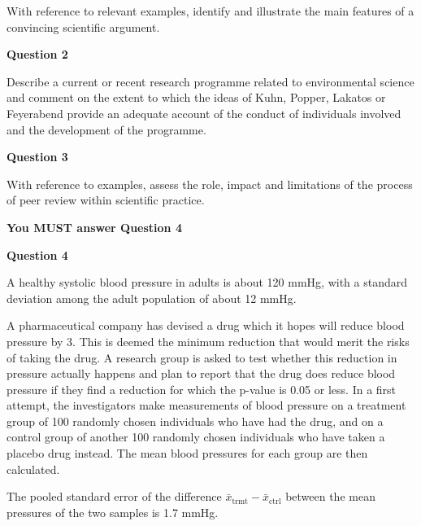 \documentclass[a4paper,12pt,fleqn]{article}
\begin{document}
With reference to relevant examples, identify and illustrate the main features of a convincing scientific argument.

\vspace{1cm}

\textbf{Question 2}\newline

Describe a current or recent research programme related to environmental science and comment on the extent to which the ideas of Kuhn, Popper, Lakatos or Feyerabend provide an adequate account of the conduct of individuals involved and the development of the programme. 

\vspace{1cm}

\textbf{Question 3}\newline

With reference to examples, assess the role, impact and limitations of the process of peer review within scientific practice.

\vspace{1cm}

\textbf{\large{You MUST answer Question 4}}\newline

\textbf{Question 4}\newline


	A healthy systolic blood pressure in adults is about 120 mmHg, with a standard deviation among the adult population of about 12 mmHg. \newline
	
	A pharmaceutical company has devised a drug which it hopes will reduce blood pressure by \SI{3}{\mmhg}. This is deemed the minimum reduction that would merit the risks of taking the drug. A research group is asked to test whether this reduction in pressure actually happens and plan to report that the drug does reduce blood pressure if they find a reduction for which the p-value is 0.05 or less. In a first attempt, the investigators make measurements of blood pressure on a treatment group of 100 randomly chosen individuals who have had the drug, and on a control group of another 100 randomly chosen individuals who have taken a placebo drug instead.  The mean blood pressures for each group are then calculated.\newline
	
	
	The pooled standard error of the difference  $\bar{x}_\text{trmt}-\bar{x}_\text{ctrl}$ between the mean pressures of the two samples is 1.7 mmHg.
\end{document}
